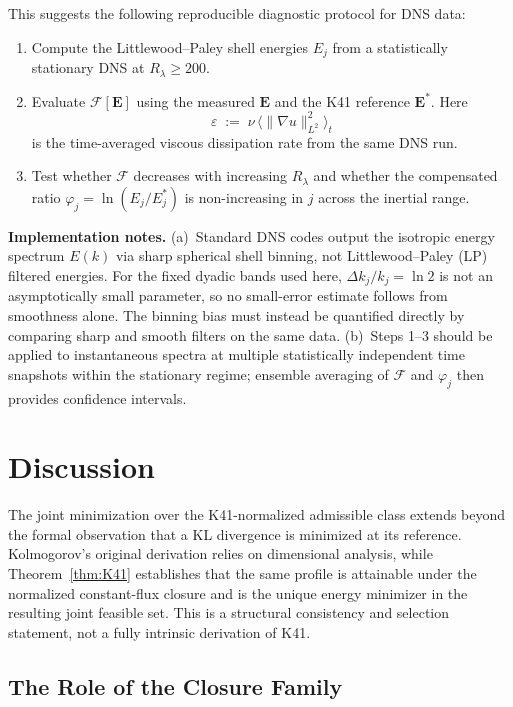 \documentclass[12pt,a4paper]{article}
\theoremstyle{definition}
\theoremstyle{plain}
\theoremstyle{remark}
\begin{document}
This suggests the following reproducible diagnostic protocol for DNS data:
\begin{enumerate}
\item Compute the Littlewood--Paley shell energies $E_j$ from
  a statistically stationary DNS at $R_\lambda \ge 200$.
\item Evaluate $\mathcal{F}[\mathbf{E}]$ using the measured
  $\mathbf{E}$ and the K41 reference $\mathbf{E}^*$.  Here
  \[
    \varepsilon
    \;:=\;
    \nu\,\bigl\langle\|\nabla u\|_{L^2}^2\bigr\rangle_t
  \]
  is the time-averaged viscous dissipation rate from the same DNS run.
\item Test whether $\mathcal{F}$ decreases with increasing $R_\lambda$
  and whether the compensated ratio $\varphi_j = \ln(E_j/E_j^*)$ is
  non-increasing in $j$ across the inertial range.
\end{enumerate}

\smallskip\noindent
\textbf{Implementation notes.}\;
(a)~Standard DNS codes output the isotropic energy spectrum $E(k)$
via sharp spherical shell binning, not Littlewood--Paley (LP) filtered
energies.  For the fixed dyadic bands used here,
$\Delta k_j/k_j=\ln2$ is not an asymptotically small parameter, so no
small-error estimate follows from smoothness alone.  The binning bias
must instead be quantified directly by comparing sharp and smooth
filters on the same data.
(b)~Steps 1--3 should be applied to instantaneous spectra at multiple
statistically independent time snapshots within the stationary regime;
ensemble averaging of $\mathcal{F}$ and $\varphi_j$ then provides
confidence intervals.

\section{Discussion}\label{sec:discussion}

The joint minimization over the K41-normalized admissible class extends
beyond the formal observation that a KL divergence is minimized at its reference.
Kolmogorov's original derivation relies on dimensional analysis, while
Theorem~\ref{thm:K41} establishes that the same profile is attainable under
the normalized constant-flux closure and is the unique energy minimizer in
the resulting joint feasible set.  This is a structural consistency and
selection statement, not a fully intrinsic derivation of K41.

\subsection{The Role of the Closure Family}
\end{document}
